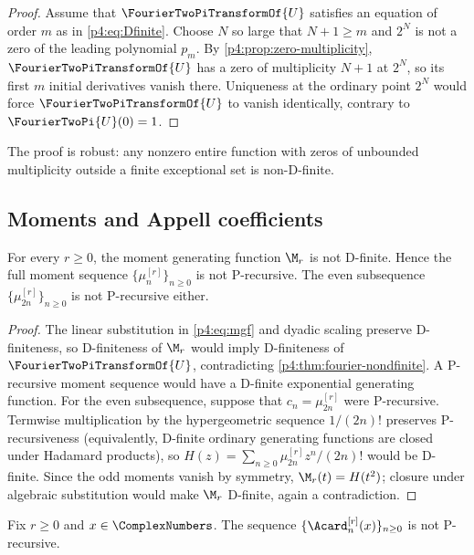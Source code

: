 \documentclass[11pt]{article}
\numberwithin{equation}{section}
\theoremstyle{definition}
\theoremstyle{remark}
\begin{document}
\begin{proof}
Assume that $\FourierTwoPiTransformOf{U}$ satisfies an equation of order $m$ as in \eqref{p4:eq:Dfinite}.  Choose $N$ so large that $N+1\ge m$ and $2^N$ is not a zero of the leading polynomial $p_m$.  By \cref{p4:prop:zero-multiplicity}, $\FourierTwoPiTransformOf{U}$ has a zero of multiplicity $N+1$ at $2^N$, so its first $m$ initial derivatives vanish there.  Uniqueness at the ordinary point $2^N$ would force $\FourierTwoPiTransformOf{U}$ to vanish identically, contrary to $\FourierTwoPi{U}(0)=1$.
\end{proof}

The proof is robust: any nonzero entire function with zeros of unbounded multiplicity outside a finite exceptional set is non-D-finite.

\subsection{Moments and Appell coefficients}
\begin{corollary}
\label{p4:cor:moments-nonP}
For every $r\ge0$, the moment generating function $\M_r$ is not D-finite.  Hence the full moment sequence
$\{\mu_n^{[r]}\}_{n\ge0}$ is not P-recursive.  The even subsequence
$\{\mu_{2n}^{[r]}\}_{n\ge0}$ is not P-recursive either.
\end{corollary}

\begin{proof}
The linear substitution in \eqref{p4:eq:mgf} and dyadic scaling preserve D-finiteness, so D-finiteness of $\M_r$ would imply D-finiteness of $\FourierTwoPiTransformOf{U}$, contradicting \cref{p4:thm:fourier-nondfinite}.  A P-recursive moment sequence would have a D-finite exponential generating function.  For the even subsequence, suppose that $c_n=\mu_{2n}^{[r]}$ were P-recursive.  Termwise multiplication by the hypergeometric sequence $1/(2n)!$ preserves P-recursiveness (equivalently, D-finite ordinary generating functions are closed under Hadamard products), so
$H(z)=\sum_{n\ge0}\mu_{2n}^{[r]}z^n/(2n)!$ would be D-finite.  Since the odd moments vanish by symmetry, $\M_r(t)=H(t^2)$; closure under algebraic substitution would make $\M_r$ D-finite, again a contradiction.
\end{proof}

\begin{corollary}
\label{p4:cor:appell-nonP}
Fix $r\ge0$ and $x\in\ComplexNumbers$.  The sequence
$\{\Acard_n^{[r]}(x)\}_{n\ge0}$ is not P-recursive.
\end{corollary}
\end{document}
